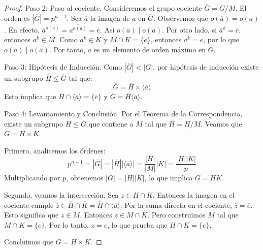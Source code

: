 \begin{proof}
Paso 2: Paso al cociente.
Consideremos el grupo cociente $\overline{G} = G/M$.
El orden es $|\overline{G}| = p^{n-1}$.
Sea $\overline{a}$ la imagen de $a$ en $\overline{G}$. Observemos que $o(\overline{a}) = o(a)$.
En efecto, $\overline{a}^{o(a)} = \overline{a^{o(a)}} = \overline{e}$. Así $o(\overline{a}) \mid o(a)$.
Por otro lado, si $\overline{a}^k = \overline{e}$, entonces $a^k \in M$.
Como $a^k \in K$ y $M \cap K = \{e\}$, entonces $a^k = e$, por lo que $o(a) \mid o(\overline{a})$.
Por tanto, $\overline{a}$ es un elemento de orden máximo en $\overline{G}$.

Paso 3: Hipótesis de Inducción.
Como $|\overline{G}| < |G|$, por hipótesis de inducción existe un subgrupo $\overline{H} \leq \overline{G}$ tal que:
\begin{equation*}
\overline{G} = \overline{H} \times \langle \overline{a} \rangle
\end{equation*}
Esto implica que $\overline{H} \cap \langle \overline{a} \rangle = \{\overline{e}\}$ y $\overline{G} = \overline{H} \langle \overline{a} \rangle$.

Paso 4: Levantamiento y Conclusión.
Por el Teorema de la Correspondencia, existe un subgrupo $H \leq G$ que contiene a $M$ tal que $\overline{H} = H/M$.
Veamos que $G = H \times K$.

Primero, analicemos los órdenes:
\begin{equation*}
p^{n-1} = |\overline{G}| = |\overline{H}| |\langle \overline{a} \rangle| = \frac{|H|}{|M|} |K| = \frac{|H||K|}{p}
\end{equation*}
Multiplicando por $p$, obtenemos $|G| = |H||K|$, lo que implica $G = HK$.

Segundo, veamos la intersección. Sea $z \in H \cap K$.
Entonces la imagen en el cociente cumple $\overline{z} \in \overline{H} \cap \overline{K} = \overline{H} \cap \langle \overline{a} \rangle$.
Por la suma directa en el cociente, $\overline{z} = \overline{e}$.
Esto significa que $z \in M$.
Entonces $z \in M \cap K$.
Pero construimos $M$ tal que $M \cap K = \{e\}$.
Por lo tanto, $z = e$, lo que prueba que $H \cap K = \{e\}$.

Concluimos que $G = H \times K$.
\end{proof}


